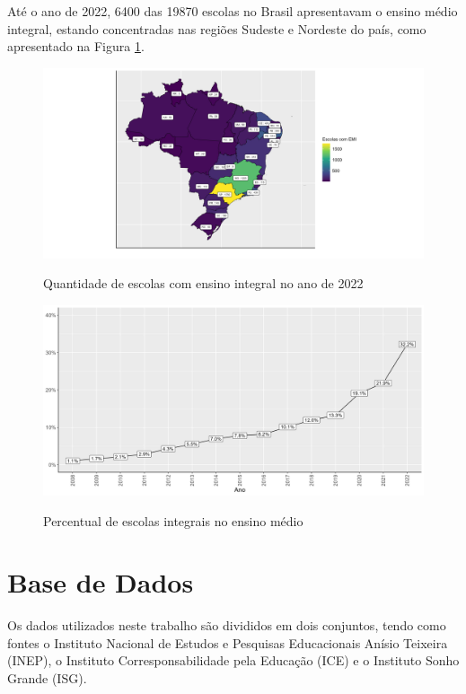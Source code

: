 Até o ano de 2022, 6400 das 19870 escolas no Brasil apresentavam o ensino médio integral, estando concentradas nas regiões Sudeste e Nordeste do país, como apresentado na Figura \ref{fig:brazil_schools}. 

\begin{figure}[H]
    \centering
    \caption{Quantidade de escolas com ensino integral no ano de 2022}
    \includegraphics[width=1.15\textwidth]{Charts/brazil_schools.png}
    \label{fig:brazil_schools}
\end{figure}

\begin{figure}[H]
  \centering
  \caption{Percentual de escolas integrais no ensino médio}
  \includegraphics[width=1\textwidth]{Charts/serie_escolas_integral.png}
  \label{fig:serie_escolas_integral}
\end{figure}
\chapter{Base de Dados} \label{dados}

Os dados utilizados neste trabalho são divididos em dois conjuntos, tendo como fontes o Instituto Nacional de Estudos e Pesquisas Educacionais Anísio Teixeira (INEP), o Instituto Corresponsabilidade pela Educação (ICE) e o Instituto Sonho Grande (ISG).


